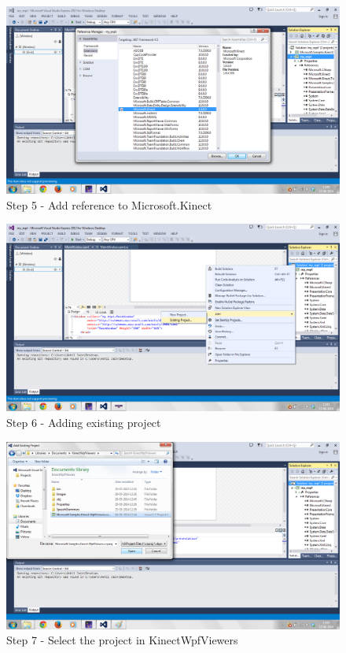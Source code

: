 \begin{flushleft}
\medskip
\begin{figure}
\begin{center}
\includegraphics[scale=0.5]{s5}
\end{center}
\caption{Step 5 - Add reference to Microsoft.Kinect}
\label{fig:e5}
\end{figure}

\medskip
\begin{figure}
\begin{center}
\includegraphics[scale=0.5]{s6}
\end{center}
\caption{Step 6 - Adding existing project}
\label{fig:e6}
\end{figure}
\medskip
\begin{figure}
\begin{center}
\includegraphics[scale=0.5]{s7}
\end{center}
\caption{Step 7 - Select the project in KinectWpfViewers}
\label{fig:e7}
\end{figure}


\end{flushleft}
